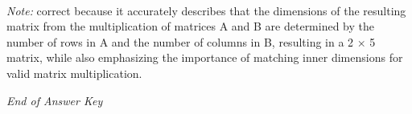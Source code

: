 \documentclass[12pt]{article}
\begin{document}
\begin{enumerate}[label=\arabic*.]
\\ \textit{Note:} correct because it accurately describes that the dimensions of the resulting matrix from the multiplication of matrices A and B are determined by the number of rows in A and the number of columns in B, resulting in a 2 × 5 matrix, while also emphasizing the importance of matching inner dimensions for valid matrix multiplication.
\end{enumerate}

\vfill
\noindent\textit{End of Answer Key}
\end{document}
